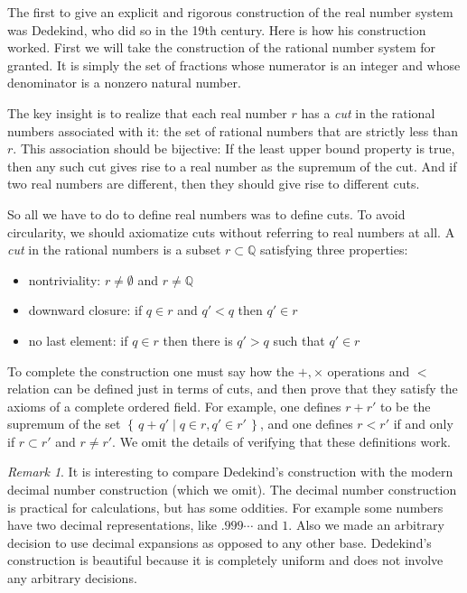 \documentclass[11pt,oneside]{amsart}
\newcommand{\set}[1]{\left\{\,#1\,\right\}}
\newcommand{\QQ}{\mathbb Q}
\theoremstyle{definition}
\theoremstyle{definition}
\theoremstyle{remark}
\newtheorem{rem}[thm]{Remark}
\begin{document}
The first to give an explicit and rigorous construction of the real number system was Dedekind, who did so in the 19th century. Here is how his construction worked. First we will take the construction of the rational number system for granted. It is simply the set of fractions whose numerator is an integer and whose denominator is a nonzero natural number.

The key insight is to realize that each real number $r$ has a \emph{cut} in the rational numbers associated with it: the set of rational numbers that are strictly less than $r$. This association should be bijective: If the least upper bound property is true, then any such cut gives rise to a real number as the supremum of the cut. And if two real numbers are different, then they should give rise to different cuts.

So all we have to do to define real numbers was to define cuts. To avoid circularity, we should axiomatize cuts without referring to real numbers at all. A \emph{cut} in the rational numbers is a subset $r\subset\QQ$ satisfying three properties:
\begin{itemize}
\item nontriviality: $r\neq\emptyset$ and $r\neq\QQ$
\item downward closure: if $q\in r$ and $q'<q$ then $q'\in r$
\item no last element: if $q\in r$ then there is $q'>q$ such that $q'\in r$
\end{itemize}
To complete the construction one must say how the $+,\times$ operations and $<$ relation can be defined just in terms of cuts, and then prove that they satisfy the axioms of a complete ordered field. For example, one defines $r+r'$ to be the supremum of the set $\set{q+q'\mid q\in r,q'\in r'}$, and one defines $r<r'$ if and only if $r\subset r'$ and $r\neq r'$. We omit the details of verifying that these definitions work.

\begin{rem}
  It is interesting to compare Dedekind's construction with the modern decimal number construction (which we omit). The decimal number construction is practical for calculations, but has some oddities. For example some numbers have two decimal representations, like $.999\cdots$ and $1$. Also we made an arbitrary decision to use decimal expansions as opposed to any other base. Dedekind's construction is beautiful because it is completely uniform and does not involve any arbitrary decisions.
\end{rem}
\end{document}
